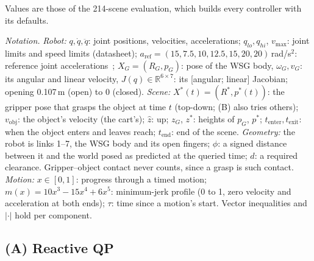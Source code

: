 \documentclass[conference]{IEEEtran}
\begin{document}
Values are those of the 214-scene evaluation, which builds every controller with its defaults.

\emph{Notation.} \emph{Robot:} $q,\dot q,\ddot q$: joint positions, velocities, accelerations; $q_{lo},q_{hi}$,
$v_{\max}$: joint limits and speed limits (datasheet); $a_{\text{ref}}=(15,7.5,10,12.5,15,20,20)$\,rad/s$^2$:
reference joint accelerations~\cite{kiemel2024jerk}; $X_G=(R_G,p_G)$: pose of the WSG body, $\omega_G,v_G$: its
angular and linear velocity, $J(q)\in\mathbb R^{6\times7}$: its [angular; linear] Jacobian; opening 0.107\,m
(open) to 0 (closed). \emph{Scene:} $X^*(t)=(R^*,p^*(t))$: the gripper pose that grasps the object at time $t$
(top-down; (B) also tries others); $v_{\text{obj}}$: the object's velocity (the cart's); $\hat z$: up; $z_G$, $z^*$:
heights of $p_G$, $p^*$; $t_{\text{enter}},t_{\text{exit}}$: when the object enters and leaves reach; $t_{\text{end}}$:
end of the scene. \emph{Geometry:} the robot is links 1--7, the WSG body and its open fingers; $\phi$: a signed
distance between it and the world posed as predicted at the queried time; $d$: a required clearance. Gripper--object
contact never counts, since a grasp is such contact. \emph{Motion:} $x\in[0,1]$: progress through a timed motion;
$m(x)=10x^3-15x^4+6x^5$: minimum-jerk profile (0 to 1, zero velocity and acceleration at both ends); $\tau$: time
since a motion's start. Vector inequalities and $|\cdot|$ hold per component.

\subsection{(A) Reactive QP}
\label{app:A}
\end{document}
